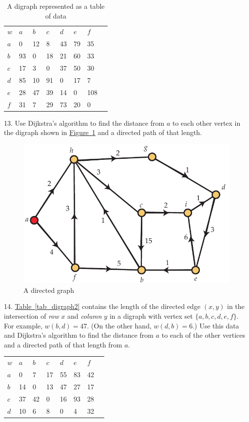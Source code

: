 \documentclass[10pt,]{book}
\theoremstyle{plain}
\theoremstyle{definition}
\theoremstyle{definition}
\theoremstyle{definition}
\theoremstyle{definition}
\numberwithin{equation}{section}
\newcommand{\hrulethin}  {\noalign{\hrule height 0.04em}}
\begin{document}
\begin{exerciselist}
\begin{table}
\begin{tabular}{lAllllll}
\(w\)&\(a\)&\(b\)&\(c\)&\(d\)&\(e\)&\(f\)\tabularnewline\hrulethin
\(a\)&0&12&8&43&79&35\tabularnewline[0pt]
\(b\)&93&0&18&21&60&33\tabularnewline[0pt]
\(c\)&17&3&0&37&50&30\tabularnewline[0pt]
\(d\)&85&10&91&0&17&7\tabularnewline[0pt]
\(e\)&28&47&39&14&0&108\tabularnewline[0pt]
\(f\)&31&7&29&73&20&0
\end{tabular}
\caption{A digraph represented as a table of data\label{tab_digraph1}}
\end{table}
\par\smallskip
\item[13.]\hypertarget{exercise-25}{}\hypertarget{p-267}{}%
Use Dijkstra's algorithm to find the distance from \(a\) to each other vertex in the digraph shown in \hyperref[fig_graphalgorithms_dijkstra_ex2]{Figure~\ref{fig_graphalgorithms_dijkstra_ex2}} and a directed path of that length.%
\begin{figure}
\centering
\includegraphics[width=0.65\linewidth]{images/dijkstra_ex2}
\caption{A directed graph\label{fig_graphalgorithms_dijkstra_ex2}}
\end{figure}
\par\smallskip
\item[14.]\hypertarget{exercise-26}{}\hypertarget{p-268}{}%
\hyperref[tab_digraph2]{Table~\ref{tab_digraph2}} contains the length of the directed edge \((x,y)\) in the intersection of \emph{row} \(x\) and \emph{column} \(y\) in a digraph with vertex set \(\{a,b,c,d,e,f\}\). For example, \(w(b,d)=47\). (On the other hand, \(w(d,b)=6\).) Use this data and Dijkstra's algorithm to find the distance from \(a\) to each of the other vertices and a directed path of that length from \(a\).%
\begin{table}
\centering
\begin{tabular}{lAllllll}
\(w\)&\(a\)&\(b\)&\(c\)&\(d\)&\(e\)&\(f\)\tabularnewline\hrulethin
\(a\)&0&7&17&55&83&42\tabularnewline[0pt]
\(b\)&14&0&13&47&27&17\tabularnewline[0pt]
\(c\)&37&42&0&16&93&28\tabularnewline[0pt]
\(d\)&10&6&8&0&4&32\tabularnewline[0pt]

\end{tabular}
\end{table}
\end{exerciselist}
\end{document}

